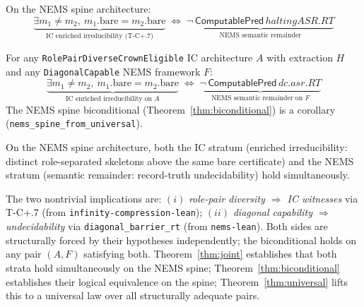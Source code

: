 \documentclass[11pt]{article}
\begin{document}
\begin{theorem}
\label{thm:biconditional}
On the NEMS spine architecture:
\[
\underbrace{\exists m_1 \neq m_2,\ m_1.\text{bare} = m_2.\text{bare}}_{\text{IC enriched irreducibility (T-C+.7)}}
\;\Longleftrightarrow\;
\underbrace{\neg\,\mathsf{ComputablePred}\,\mathit{haltingASR.RT}}_{\text{NEMS semantic remainder}}
\]
\par{}
\end{theorem}

\begin{theorem}
\label{thm:universal}
For any \texttt{RolePairDiverseCrownEligible} IC architecture $A$ with extraction $H$
and any \texttt{DiagonalCapable} NEMS framework $F$:
\[
\underbrace{\exists m_1 \neq m_2,\ m_1.\text{bare} = m_2.\text{bare}}_{\text{IC enriched irreducibility on }A}
\;\Longleftrightarrow\;
\underbrace{\neg\,\mathsf{ComputablePred}\,\mathit{dc.asr.RT}}_{\text{NEMS semantic remainder on }F}
\]
The NEMS spine biconditional (Theorem~\ref{thm:biconditional}) is a corollary
(\texttt{nems\_spine\_from\_universal}).
\par{}
\end{theorem}

\begin{theorem}
\label{thm:joint}
On the NEMS spine architecture, both the IC stratum (enriched irreducibility: distinct
role-separated skeletons above the same bare certificate) and the NEMS stratum (semantic
remainder: record-truth undecidability) hold simultaneously.
\par{}
\end{theorem}

The two nontrivial implications are:
$(i)$ \emph{role-pair diversity $\Rightarrow$ IC witnesses} via T-C+.7 (from \texttt{infinity-compression-lean});
$(ii)$ \emph{diagonal capability $\Rightarrow$ undecidability} via \texttt{diagonal\_barrier\_rt} (from \texttt{nems-lean}).
Both sides are structurally forced by their hypotheses independently; the biconditional
holds on any pair $(A, F)$ satisfying both.  Theorem~\ref{thm:joint} establishes
that both strata hold simultaneously on the NEMS spine;
Theorem~\ref{thm:biconditional} establishes their logical equivalence on the spine;
Theorem~\ref{thm:universal} lifts this to a universal law over all structurally
adequate pairs.
\end{document}
